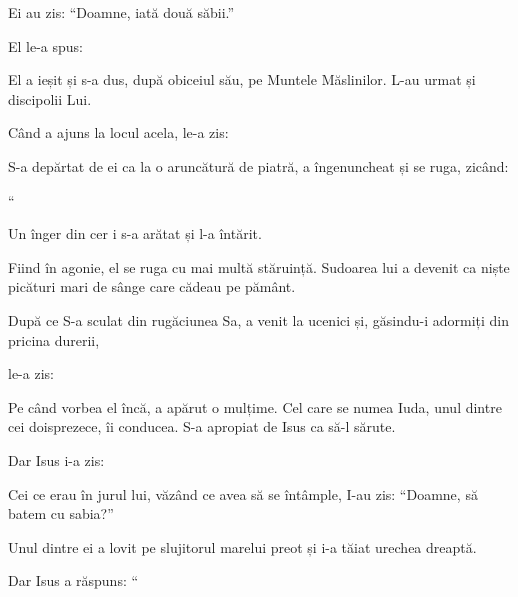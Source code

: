 {


\par }{\PP {}Ei au zis: “Doamne, iată două săbii.”

\par }{\PP El le-a spus:
{}


\par }{\PP {}El a ieșit și s-a dus, după obiceiul său, pe Muntele Măslinilor. L-au urmat și discipolii Lui.

Când a ajuns la locul acela, le-a zis:
{}


\par }{\PP {}S-a depărtat de ei ca la o aruncătură de piatră, a îngenuncheat și se ruga, zicând:

“{}


\par }{\PP {}Un înger din cer i s-a arătat și l-a întărit.

Fiind în agonie, el se ruga cu mai multă stăruință. Sudoarea lui a devenit ca niște picături mari de sânge care cădeau pe pământ.


\par }{\PP {}După ce S-a sculat din rugăciunea Sa, a venit la ucenici și, găsindu-i adormiți din pricina durerii,

le-a zis:
{}


\par }{\PP {}Pe când vorbea el încă, a apărut o mulțime. Cel care se numea Iuda, unul dintre cei doisprezece, îi conducea. S-a apropiat de Isus ca să-l sărute.

Dar Isus i-a zis:
{}


\par }{\PP {}Cei ce erau în jurul lui, văzând ce avea să se întâmple, I-au zis: “Doamne, să batem cu sabia?”

Unul dintre ei a lovit pe slujitorul marelui preot și i-a tăiat urechea dreaptă.


\par }{\PP {}Dar Isus a răspuns: “{}

}
